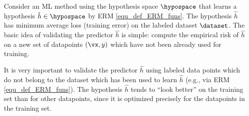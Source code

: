 \documentclass[12pt]{report}
\begin{document}

%

Consider an ML method using the hypothesis space $\hypospace$ that  
learns a hypothesis $\hat{h} \in \hypospace$ by ERM \eqref{equ_def_ERM_funs}. 
The hypothesis $\hat{h}$ has minimum average loss (training error) on the 
labeled dataset $\dataset$. The basic idea of validating the predictor $\hat{h}$ 
is simple: compute the empirical risk of $\hat{h}$ on a new set of datapoints $(\vx,y)$ 
which have not been already used for training. 

It is very important to validate the predictor $\hat{h}$ using labeled data 
points which do not belong to the dataset which has been used to learn 
$\hat{h}$ (e.g., via ERM \eqref{equ_def_ERM_funs}). The hypothesis 
$\hat{h}$ tends to ``look better'' on the training set than for other 
datapoints, since it is optimized precisely for the datapoints in the 
training set. 
\vspace*{2mm}
\begin{center}
\end{center}
 
\end{document}
